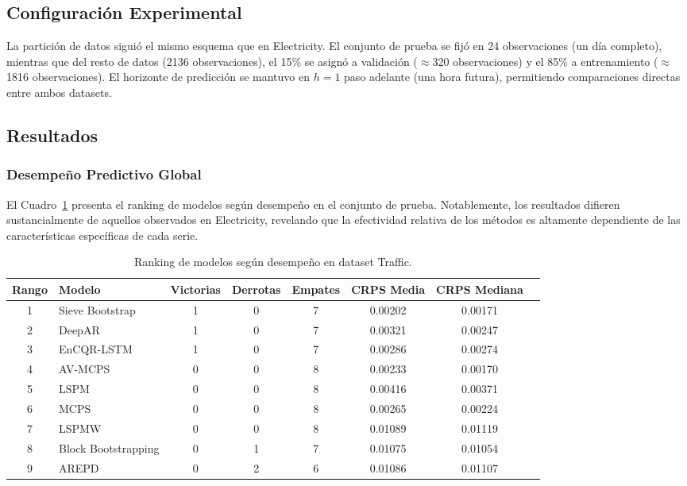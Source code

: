 \subsection{Configuración Experimental}
\label{subsec:traffic_configuracion}

La partición de datos siguió el mismo esquema que en Electricity. El conjunto de prueba se fijó en 24 observaciones (un día completo), mientras que del resto de datos (2136 observaciones), el 15\% se asignó a validación ($\approx$320 observaciones) y el 85\% a entrenamiento ($\approx$1816 observaciones). El horizonte de predicción se mantuvo en $h = 1$ paso adelante (una hora futura), permitiendo comparaciones directas entre ambos datasets.

\subsection{Resultados}
\label{subsec:traffic_resultados}

\subsubsection{Desempeño Predictivo Global}

El Cuadro~\ref{tab:traffic_ranking} presenta el ranking de modelos según desempeño en el conjunto de prueba. Notablemente, los resultados difieren sustancialmente de aquellos observados en Electricity, revelando que la efectividad relativa de los métodos es altamente dependiente de las características específicas de cada serie.

\begin{table}[htbp]
\centering
\caption{Ranking de modelos según desempeño en dataset Traffic.}
\label{tab:traffic_ranking}
\small
\begin{tabular}{clcccccc}
\toprule
\textbf{Rango} & \textbf{Modelo} & \textbf{Victorias} & \textbf{Derrotas} & \textbf{Empates} &\textbf{CRPS Media} & \textbf{CRPS Mediana} \\
\midrule
1 & Sieve Bootstrap & 1 & 0 & 7 & 0.00202 & 0.00171 \\
2 & DeepAR & 1 & 0 & 7 & 0.00321 & 0.00247 \\
3 & EnCQR-LSTM & 1 & 0 & 7 & 0.00286 & 0.00274 \\
4 & AV-MCPS & 0 & 0 & 8 &  0.00233 & 0.00170 \\
5 & LSPM & 0 & 0 & 8 &  0.00416 & 0.00371 \\
6 & MCPS & 0 & 0 & 8 &  0.00265 & 0.00224 \\
7 & LSPMW & 0 & 0 & 8 &  0.01089 & 0.01119 \\
8 & Block Bootstrapping & 0 & 1 & 7 &  0.01075 & 0.01054 \\
9 & AREPD & 0 & 2 & 6 &  0.01086 & 0.01107 \\
\bottomrule
\end{tabular}
\end{table}

